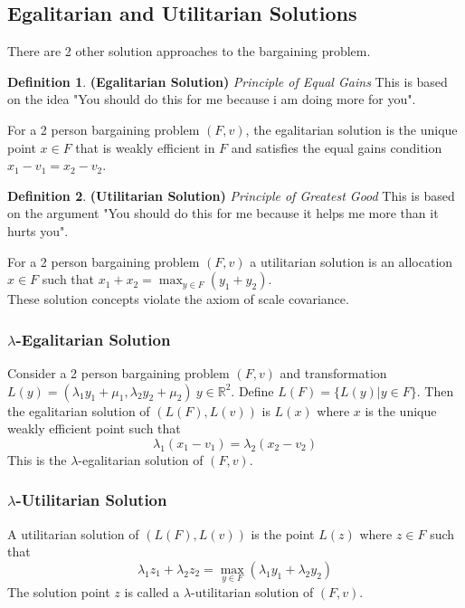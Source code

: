 \documentclass{article}
\theoremstyle{definition}
\newtheorem{defn}{Definition}[section]
\begin{document}
\subsection{Egalitarian and Utilitarian Solutions}
There are 2 other solution approaches to the bargaining problem.
\begin{defn}
\textbf{(Egalitarian Solution)} \textit{Principle of Equal Gains} This is based on the idea "You should do this for me because i am doing more for you".
\end{defn}
For a 2 person bargaining problem $(F,v)$, the egalitarian solution is the unique point $x\in F$ that is weakly efficient in $F$ and satisfies the equal gains condition $x_1-v_1 = x_2-v_2$.
\begin{defn}
\textbf{(Utilitarian Solution)} \textit{Principle of Greatest Good} This is based on the argument "You should do this for me because it helps me more than it hurts you".
\end{defn}
For a 2 person bargaining problem $(F,v)$ a utilitarian solution is an allocation $x\in F$ such that $x_1 + x_2 = \max_{y\in F} (y_1 + y_2)$.\\
These solution concepts violate the axiom of scale covariance.
\subsubsection*{$\lambda$-Egalitarian Solution}
Consider a 2 person bargaining problem $(F,v)$ and transformation $L(y) = (\lambda_1y_1 + \mu_1,\lambda_2y_2 + \mu_2)~y\in \mathbb{R}^2$. Define $L(F) = \{L(y)|y\in F\}$. Then the egalitarian solution of $(L(F),L(v))$ is $L(x)$ where $x$ is the unique weakly efficient point such that $$\lambda_1(x_1-v_1) = \lambda_2(x_2-v_2)$$ This is the $\lambda$-egalitarian solution of $(F,v)$.
\subsubsection*{$\lambda$-Utilitarian Solution}
A utilitarian solution of $(L(F),L(v))$ is the point $L(z)$ where $z\in F$ such that $$\lambda_1z_1 + \lambda_2z_2 = \max_{y\in F}(\lambda_1y_1 + \lambda_2y_2)$$
The solution point $z$ is called a $\lambda$-utilitarian solution of $(F,v)$.
\end{document}
